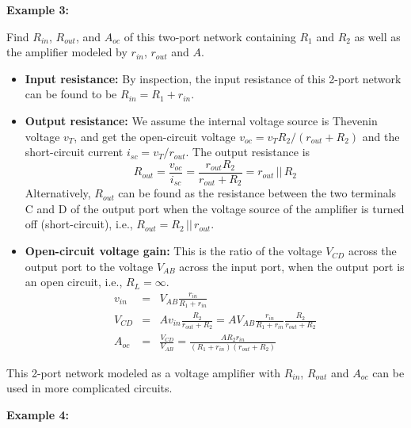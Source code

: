 \begin{itemize}
{\bf Example 3:} 


Find $R_{in}$, $R_{out}$, and $A_{oc}$ of this two-port network containing
$R_1$ and $R_2$ as well as the amplifier modeled by $r_{in}$, $r_{out}$ and $A$. 

\begin{itemize}
\item {\bf Input resistance:} By inspection, the input resistance of this
  2-port network can be found to be $R_{in}=R_1+r_{in}$.

\item {\bf Output resistance:} We assume the internal voltage source is 
  Thevenin voltage $v_T$, and get the open-circuit voltage 
  $v_{oc}=v_T R_2/(r_{out}+R_2)$ and the short-circuit current
  $i_{sc}=v_T/r_{out}$. The output resistance is
  \[ R_{out}=\frac{v_{oc}}{i_{sc}}=\frac{r_{out}R_2}{r_{out}+R_2}=r_{out}\,||\,R_2 \]
  Alternatively, $R_{out}$ can be found as the resistance between the two terminals
  C and D of the output port when the voltage source of the amplifier is turned off 
  (short-circuit), i.e., $R_{out}=R_2\,||\, r_{out}$.

\item {\bf Open-circuit voltage gain:} This is the ratio of the voltage $V_{CD}$
  across the output port to the voltage $V_{AB}$ across the input port, when the
  output port is an open circuit, i.e., $R_L=\infty$. 
  \begin{eqnarray}
    v_{in}&=&V_{AB}\frac{r_{in}}{R_1+r_{in}}  \nonumber \\
    V_{CD}&=&A v_{in} \frac{R_2}{r_{out}+R_2}=A V_{AB}\frac{r_{in}}{R_1+r_{in}} 
    \frac{R_2}{r_{out}+R_2} \nonumber \\
    A_{oc}&=&\frac{V_{CD}}{V_{AB}}=\frac{A R_2 r_{in}}{(R_1+r_{in})(r_{out}+R_2)} 
    \nonumber 
  \end{eqnarray}
\end{itemize}
This 2-port network modeled as a voltage amplifier with $R_{in}$, $R_{out}$
and $A_{oc}$ can be used in more complicated circuits.

{\bf Example 4:} 



\end{itemize}
